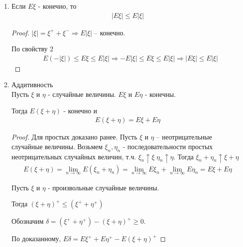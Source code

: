 \begin{enumerate}[label=\protect\circled{\arabic*},series=mean_properties]
\begin{proof}
      Пусть $\xi$ и $\eta$ - произвольные.

      Тогда $\xi^+(\omega) \geq \eta^+(\omega)$ и $\xi^-(\omega) \leq \eta^-(\omega)$

      $\Rightarrow E \eta = E \eta^+ - E \eta^- \leq E \xi^+ - E \xi^- = E \xi$
    \end{proof}

  \item 
    Если $E \xi$ - конечно, то
    \begin{align*}
      |E \xi| \leq E |\xi|
    \end{align*}

    \begin{proof}
      $|\xi| = \xi^+ + \xi^- \Rightarrow E|\xi|$ -- конечно.

      По свойству 2
      \begin{align*}
        &E(-|\xi|) \leq E \xi \leq E |\xi|
        \Rightarrow -E|\xi| \leq E\xi \leq E|\xi| \Rightarrow |E\xi| \leq E|\xi|
      \end{align*}
    \end{proof}

  \item 
    Аддитивность\\
    Пусть $\xi$ и $\eta$ - случайные величины. $E \xi$ и $E \eta$ - конечны.

    Тогда $E (\xi + \eta)$ - конечно и
    \begin{align*}
      E (\xi + \eta) = E \xi + E \eta
    \end{align*}

    \begin{proof}
      Для простых доказано ранее. Пусть $\xi$ и $\eta$ -- неотрицательные случайные величины.
      Возьмем $\xi_n, \eta_n$ - последовательности простых неотрицательных случайных величин, 
      т.ч. $\xi_n \uparrow \xi\;\eta_n \uparrow \eta$. Тогда $\xi_n + \eta_n \uparrow \xi + \eta$
      \begin{align*}
        E (\xi + \eta) = \lim_{n \to \infty} E(\xi_n + \eta_n) = 
        \lim_{n \to \infty} E \xi_n + \lim_{n \to \infty} E \eta_n = E \xi + E \eta
      \end{align*}
     
      Пусть $\xi$ и $\eta$ - произвольные случайные величины.

      Тогда $(\xi + \eta)^+ \leq (\xi^+ + \eta^+)$

      Обозначим $\delta = (\xi^+ + \eta^+) - (\xi + \eta)^+ \geq 0$.

	  По доказанному, $E\delta = E\xi^+ + E\eta^+ - E(\xi + \eta)^+$


\end{proof}
\end{enumerate}
